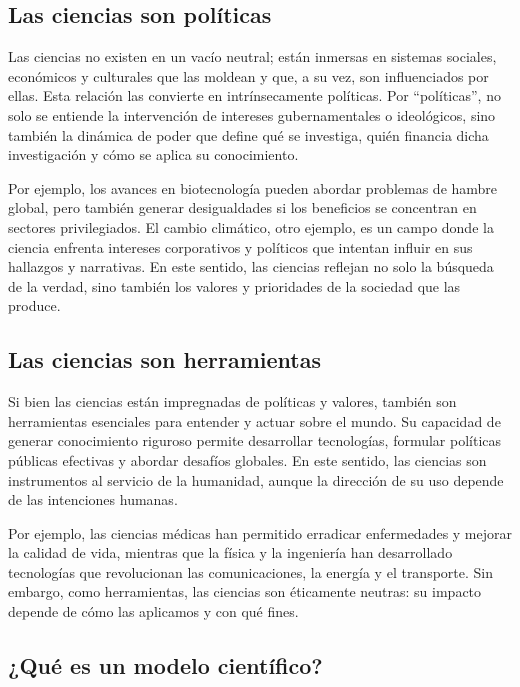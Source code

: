 \documentclass[
  letterpaper,
  DIV=11,
  numbers=noendperiod]{scrreprt}
\begin{document}
\subsection{Las ciencias son
políticas}\label{las-ciencias-son-poluxedticas}

Las ciencias no existen en un vacío neutral; están inmersas en sistemas
sociales, económicos y culturales que las moldean y que, a su vez, son
influenciados por ellas. Esta relación las convierte en intrínsecamente
políticas. Por ``políticas'', no solo se entiende la intervención de
intereses gubernamentales o ideológicos, sino también la dinámica de
poder que define qué se investiga, quién financia dicha investigación y
cómo se aplica su conocimiento.

Por ejemplo, los avances en biotecnología pueden abordar problemas de
hambre global, pero también generar desigualdades si los beneficios se
concentran en sectores privilegiados. El cambio climático, otro ejemplo,
es un campo donde la ciencia enfrenta intereses corporativos y políticos
que intentan influir en sus hallazgos y narrativas. En este sentido, las
ciencias reflejan no solo la búsqueda de la verdad, sino también los
valores y prioridades de la sociedad que las produce.

\subsection{Las ciencias son
herramientas}\label{las-ciencias-son-herramientas}

Si bien las ciencias están impregnadas de políticas y valores, también
son herramientas esenciales para entender y actuar sobre el mundo. Su
capacidad de generar conocimiento riguroso permite desarrollar
tecnologías, formular políticas públicas efectivas y abordar desafíos
globales. En este sentido, las ciencias son instrumentos al servicio de
la humanidad, aunque la dirección de su uso depende de las intenciones
humanas.

Por ejemplo, las ciencias médicas han permitido erradicar enfermedades y
mejorar la calidad de vida, mientras que la física y la ingeniería han
desarrollado tecnologías que revolucionan las comunicaciones, la energía
y el transporte. Sin embargo, como herramientas, las ciencias son
éticamente neutras: su impacto depende de cómo las aplicamos y con qué
fines.

\subsection{¿Qué es un modelo
científico?}\label{quuxe9-es-un-modelo-cientuxedfico}
\end{document}
